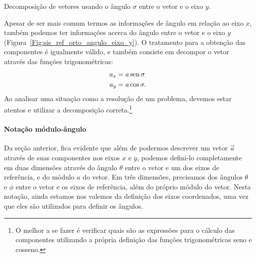 \begin{marginfigure}
\centering
{}
\caption{Decomposição de vetores usando o ângulo $\sigma$ entre o vetor e o eixo $y$.\label{Fig:sis_ref_orto_angulo_eixo_y}}
\end{marginfigure}

Apesar de ser mais comum termos as informações de ângulo em relação ao eixo $x$, também podemos ter informações acerca do ângulo entre o vetor e o eixo $y$ (Figura~\ref{Fig:sis_ref_orto_angulo_eixo_y}). O tratamento para a obtenção das componentes é igualmente válido, e também consiste em decompor o vetor através das funções trigonométricas:
\begin{align}
    a_x &= a\operatorname{sen}\sigma \\
    a_y &= a\cos\sigma.
\end{align}
%
Ao analisar uma situação como a resolução de um problema, devemos estar atentos e utilizar a decomposição correta.\footnote{O melhor a se fazer é verificar quais são as expressões para o cálculo das componentes utilizando a própria definição das funções trigonométricas seno e cosseno.}

\paragraph{Notação módulo-ângulo}

Da seção anterior, fica evidente que além de podermos descrever um vetor $\vec{a}$ através de suas componentes nos eixos $x$ e $y$, podemos defini-lo completamente em duas dimensões através do ângulo $\theta$ entre o vetor e um dos eixos de referência, e do módulo $a$ do vetor. Em três dimensões, precisamos dos ângulos $\theta$ e $\phi$ entre o vetor e os eixos de referência, além do próprio módulo do vetor. Nesta notação, ainda estamos nos valemos da definição dos eixos coordenados, uma vez que eles são utilizados para definir os ângulos. 

